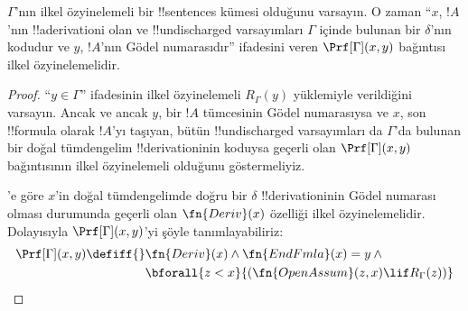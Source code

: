 \documentclass[../../../include/open-logic-section]{subfiles}
\begin{document}
\begin{prop}
  $\Gamma$'nın ilkel özyinelemeli bir !!{sentence}s kümesi olduğunu varsayın.
  O zaman ``$x$, $!A$'nın !!a{derivation}{}i olan ve !!{undischarged}
  varsayımları $\Gamma$ içinde bulunan bir $\delta$'nın kodudur ve $y$,
  $!A$'nın Gödel
  numarasıdır'' ifadesini veren $\Prf[\Gamma](x, y)$ bağıntısı ilkel
  özyinelemelidir.
\end{prop}

\begin{proof}
  ``$y \in \Gamma$'' ifadesinin ilkel özyinelemeli $R_\Gamma(y)$ yüklemiyle
  verildiğini varsayın. Ancak ve ancak $y$, bir $!A$ tümcesinin Gödel
  numarasıysa ve $x$, son !!{formula} olarak $!A$'yı taşıyan, bütün !!{undischarged}
  varsayımları da $\Gamma$'da bulunan bir doğal tümdengelim !!{derivation}{}inin
  koduysa geçerli olan $\Prf[\Gamma](x, y)$ bağıntısının ilkel
  özyinelemeli olduğunu göstermeliyiz.

  'e göre $x$'in doğal tümdengelimde doğru bir $\delta$
  !!{derivation}{}inin Gödel numarası olması durumunda geçerli olan
  $\fn{Deriv}(x)$ özelliği ilkel özyinelemelidir. Dolayısıyla
  $\Prf[\Gamma](x, y)$'yi şöyle tanımlayabiliriz:
  \begin{align*}
    \Prf[\Gamma](x, y) \defiff {}
    & \fn{Deriv}(x) \land \fn{EndFmla}(x) = y \land {} \\
    & \bforall{z < x}{(\fn{OpenAssum}(z, x) \lif R_\Gamma(z))}
  \end{align*}
\end{proof}
\end{document}
